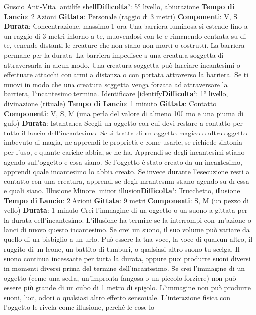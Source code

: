 \begin{multicols}{2}
Guscio Anti-Vita
[antilife shell\textbf{Difficolta'}:
5° livello, abiurazione
\textbf{Tempo di Lancio}: 2 Azioni
\textbf{Gittata}: Personale (raggio di 3 metri)
\textbf{Componenti}: V, S
\textbf{Durata}: Concentrazione, massimo 1 ora
Una barriera luminosa si estende fino a un raggio di 3
metri intorno a te, muovendosi con te e rimanendo
centrata su di te, tenendo distanti le creature che non
siano non morti o costrutti. La barriera permane per la
durata.
La barriera impedisce a una creatura soggetta di
attraversarla in alcun modo. Una creatura soggetta può
lanciare incantesimi o effettuare attacchi con armi a
distanza o con portata attraverso la barriera.
Se ti muovi in modo che una creatura soggetta venga
forzata ad attraversare la barriera, l’incantesimo
termina.
Identificare
[identify\textbf{Difficolta'}:
1° livello, divinazione (rituale)
\textbf{Tempo di Lancio}: 1 minuto
\textbf{Gittata}: Contatto
\textbf{Componenti}: V, S, M (una perla del valore di almeno
100 mo e una piuma di gufo)
\textbf{Durata}: Istantanea
Scegli un oggetto con cui devi restare a contatto per
tutto il lancio dell’incantesimo. Se si tratta di un oggetto
magico o altro oggetto imbevuto di magia, ne apprendi
le proprietà e come usarle, se richiede sintonia per
l’uso, e quante cariche abbia, se ne ha. Apprendi se
degli incantesimi stiano agendo sull’oggetto e cosa
siano. Se l’oggetto è stato creato da un incantesimo,
apprendi quale incantesimo lo abbia creato.
Se invece durante l’esecuzione resti a contatto con una
creatura, apprendi se degli incantesimi stiano agendo
su di essa e quali siano.
Illusione Minore
[minor illusion\textbf{Difficolta'}:
Trucchetto, illusione
\textbf{Tempo di Lancio}: 2 Azioni
\textbf{Gittata}: 9 metri
\textbf{Componenti}: S, M (un pezzo di vello)
\textbf{Durata}: 1 minuto
Crei l’immagine di un oggetto o un suono a gittata per la
durata dell’incantesimo. L’illusione ha termine se la
interrompi con un’azione o lanci di nuovo questo
incantesimo.
Se crei un suono, il suo volume può variare da quello di
un bisbiglio a un urlo. Può essere la tua voce, la voce di
qualcun altro, il ruggito di un leone, un battito di
tamburi, o qualsiasi altro suono tu scelga. Il suono
continua incessante per tutta la durata, oppure puoi
produrre suoni diversi in momenti diversi prima del
termine dell’incantesimo.
Se crei l’immagine di un oggetto (come una sedia,
un’impronta fangosa o un piccolo forziere) non può
essere più grande di un cubo di 1 metro di spigolo.
L’immagine non può produrre suoni, luci, odori o
qualsiasi altro effetto sensoriale. L’interazione fisica con
l’oggetto lo rivela come illusione, perché le cose lo

\end{multicols}

